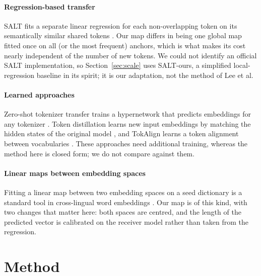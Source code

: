 \documentclass[preprint,12pt]{elsarticle}
\begin{document}
\paragraph{Regression-based transfer}SALT fits a separate linear regression for each non-overlapping token on its semantically similar shared tokens \cite{lee2025salt}. Our map differs in being one global map fitted once on all (or the most frequent) anchors, which is what makes its cost nearly independent of the number of new tokens. We could not identify an official SALT implementation, so Section~\ref{sec:scale} uses SALT-ours, a simplified local-regression baseline in its spirit; it is our adaptation, not the method of Lee et al.\par\paragraph{Learned approaches} Zero-shot tokenizer transfer trains a hypernetwork that predicts embeddings for any tokenizer \cite{minixhofer2024zett}. Token distillation learns new input embeddings by matching the hidden states of the original model \cite{dobler2025tokendistillation}, and TokAlign learns a token alignment between vocabularies \cite{li2025tokalign}. These approaches need additional training, whereas the method here is closed form; we do not compare against them.

\paragraph{Linear maps between embedding spaces} Fitting a linear map between two embedding spaces on a seed dictionary is a standard tool in cross-lingual word embeddings \cite{mikolov2013exploiting}. Our map is of this kind, with two changes that matter here: both spaces are centred, and the length of the predicted vector is calibrated on the receiver model rather than taken from the regression.

\section{Method}
\label{sec:method}
\end{document}
